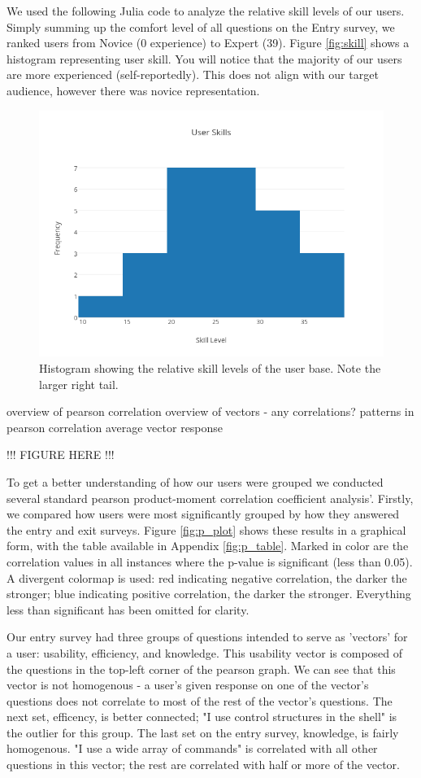 We used the following Julia code to analyze the relative skill levels of our
users. Simply summing up the comfort level of all questions on the Entry survey,
we ranked users from Novice (0 experience) to Expert (39). Figure
\ref{fig:skill} shows a histogram representing user skill. You will notice that
the majority of our users are more experienced (self-reportedly). This does not
align with our target audience, however there was novice representation.
\begin{figure}[ht]
  \centering
  \includegraphics[width=0.8\linewidth]{figures/stats/user-skills.png}
  \caption{\label{fig:Skill} Histogram showing the relative skill levels of the
    user base. Note the larger right tail. }
\end{figure}

overview of pearson correlation
overview of vectors - any correlations?
patterns in pearson correlation
average vector response

!!! FIGURE HERE !!!

To get a better understanding of how our users were grouped we conducted several
standard pearson product-moment correlation coefficient analysis'. Firstly, we
compared how users were most significantly grouped by how they answered the
entry and exit surveys. Figure \ref{fig:p_plot} shows these results in a
graphical form, with the table available in Appendix \ref{fig:p_table}. Marked
in color are the correlation values in all instances where the p-value is
significant (less than 0.05). A divergent colormap is used: red indicating
negative correlation, the darker the stronger; blue indicating positive
correlation, the darker the stronger. Everything less than significant has been
omitted for clarity.

Our entry survey had three groups of questions intended to serve as 'vectors'
for a user: usability, efficiency, and knowledge. This usability vector is
composed of the questions in the top-left corner of the pearson graph. We can
see that this vector is not homogenous -  a user's given response on one of the
vector's questions does not correlate to most of the rest of the vector's
questions. The next set, efficency, is better connected; "I use control
structures in the shell" is the outlier for this group. The last set on the
entry survey, knowledge, is fairly homogenous. "I use a wide array of commands"
is correlated with all other questions in this vector; the rest are correlated
with half or more of the vector.

